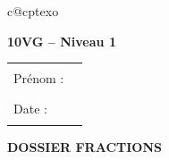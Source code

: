 

\providecommand{\Case}{\,\fbox{\rule{0pt}{2.1ex}\hspace{0.7cm}}\,}
\providecommand{\CaseC}{\,\fbox{\rule{0pt}{2.1ex}\hspace{0.4cm}}\,}
\providecommand{\ItemGuide}[1]{\vspace{4pt}\par\noindent\fcolorbox{themeNO}{themeNO!10}{\parbox{\dimexpr\linewidth-2\fboxsep-2\fboxrule\relax}{\vspace{2pt}#1\vspace{2pt}}}\par\vspace{6pt}}
\providecommand{\FA}[2]{\dfrac{\vphantom{\CaseC}#1}{\vphantom{\CaseC}#2}}

\ifcsname c@cptexo\endcsname\else{}\fi
\setcounter{cptexo}{0}
\providecommand{\Exo}[2]{\refstepcounter{cptexo}\label{#1}\textbf{Exercice \thecptexo.} #2}


\clearpage
\thispagestyle{empty}
\textbf{10VG -- Niveau 1}\hfill
\begin{tabularx}{0.4\textwidth}{Xl}
Prénom :& \rule{4cm}{0.4pt}\\[3mm]
Date : &\rule{4cm}{0.4pt}
\end{tabularx}

\vfill
\begin{center}
\begin{tcolorbox}[colback=themeNO!30,colframe=themeNO!65!black,halign=flush center,width=0.6\textwidth,arc=3mm,boxsep=3mm]
{\Huge\bfseries\color{themeNO!65!black} DOSSIER FRACTIONS}
\end{tcolorbox}
\end{center}


